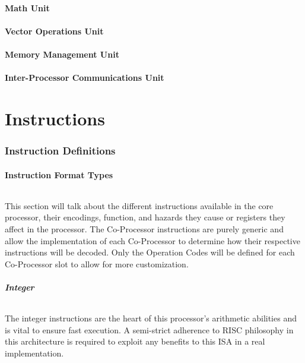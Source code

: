 \documentclass[letterpaper, 11pt]{article}
\begin{document}
\subsection{Math Unit}
\subsection{Vector Operations Unit}
\subsection{Memory Management Unit}
\subsection{Inter-Processor Communications Unit}

\clearpage

\part{Instructions}
\section{Instruction Definitions}
\subsection{Instruction Format Types}
\paragraph{}This section will talk about the different instructions available in the core processor, their encodings, function, and hazards
they cause or registers they affect in the processor. The Co-Processor instructions are purely generic and allow the implementation of
each Co-Processor to determine how their respective instructions will be decoded. Only the Operation Codes will be defined for each 
Co-Processor slot to allow for more customization.

\newpage
\subsubsection{Integer}
\paragraph{}The integer instructions are the heart of this processor's arithmetic abilities and is vital to ensure fast execution. A semi-strict
adherence to RISC philosophy in this architecture is required to exploit any benefits to this ISA in a real implementation.
\end{document}
